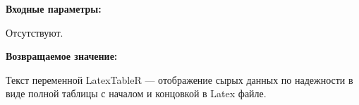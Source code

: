 \textbf{Входные параметры:}

Отсутствуют.

\textbf{Возвращаемое значение:}

Текст переменной LatexTableR --- отображение сырых данных по надежности в виде полной таблицы с началом и концовкой в Latex файле.